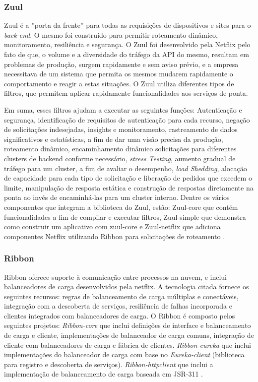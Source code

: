 \documentclass[journal]{IEEEtran}
\begin{document}
\subsubsection{Zuul}
Zuul é a ''porta da frente'' para todas as requisições de dispositivos e sites para o \emph{back-end}. O mesmo foi construído para permitir roteamento dinâmico, monitoramento, resiliência e segurança. O Zuul foi desenvolvido pela Netflix pelo fato de que, o volume e a diversidade do tráfego da API do mesmo, resultam em problemas de produção, surgem rapidamente e sem aviso prévio, e a empresa necessitava de um sistema que permita os mesmos mudarem rapidamente o comportamento e reagir a estas situações. O Zuul utiliza diferentes tipos de filtros, que permitem aplicar rapidamente funcionalidades aos serviços de ponta. 

Em suma, esses filtros ajudam a executar as seguintes funções: Autenticação e segurança, identificação de requisitos de autenticação para cada recurso, negação de solicitações indesejadas, insights e monitoramento, rastreamento de dados significativos e estatísticas, a fim de dar uma visão precisa da produção, roteamento dinâmico, encaminhamento dinâmico solicitações para diferentes clusters de backend conforme necessário, \emph{stress Testing}, aumento gradual de tráfego para um cluster, a fim de avaliar o desempenho, \emph{load Shedding}, alocação de capacidade para cada tipo de solicitação e liberação de pedidos que excedem o limite, manipulação de resposta estática e construção de respostas diretamente na ponta ao invés de encaminhá-las para um cluster interno.
Dentre os vários componentes que integram a biblioteca do Zuul, estão: Zuul-core que contém funcionalidades a fim de compilar e executar filtros, Zuul-simple que demonstra como construir um aplicativo com zuul-core e Zuul-netflix que adiciona componentes Netflix utilizando Ribbon para solicitações de roteamento \cite{netflix2016Zuul}.


\subsubsection{Ribbon}
Ribbon oferece suporte à comunicação entre processos na nuvem, e inclui balanceadores de carga desenvolvidos pela netflix. A tecnologia citada fornece os seguintes recursos: regras de balanceamento de carga múltiplas e conectáveis, integração com a descoberta de serviços, resiliência de falhas incorporada e clientes integrados com balanceadores de carga. O Ribbon é composto pelos seguintes projetos: \emph{Ribbon-core} que inclui definições de interface e balanceamento de carga e cliente, implementações de balanceador de carga comuns, integração de cliente com balanceadores de carga e fábrica de clientes. \emph{Ribbon-eureka} que inclui implementações do balanceador de carga com base no \emph{Eureka-client} (biblioteca para registro e descoberta de serviços). \emph{Ribbon-httpclient} que inclui a implementação de balanceamento de carga baseada em JSR-311 \cite{netflix2016Ribbon}.
\end{document}
